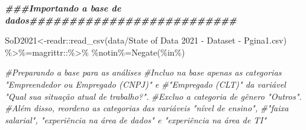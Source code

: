 \documentclass[
]{article}
\newenvironment{Shaded}{\begin{snugshade}}{\end{snugshade}}
\newcommand{\AttributeTok}[1]{\textcolor[rgb]{0.77,0.63,0.00}{#1}}
\newcommand{\CommentTok}[1]{\textcolor[rgb]{0.56,0.35,0.01}{\textit{#1}}}
\newcommand{\DocumentationTok}[1]{\textcolor[rgb]{0.56,0.35,0.01}{\textbf{\textit{#1}}}}
\newcommand{\FunctionTok}[1]{\textcolor[rgb]{0.00,0.00,0.00}{#1}}
\newcommand{\NormalTok}[1]{#1}
\newcommand{\OtherTok}[1]{\textcolor[rgb]{0.56,0.35,0.01}{#1}}
\newcommand{\SpecialCharTok}[1]{\textcolor[rgb]{0.00,0.00,0.00}{#1}}
\newcommand{\StringTok}[1]{\textcolor[rgb]{0.31,0.60,0.02}{#1}}
\begin{document}
\begin{Shaded}
\begin{Highlighting}[]
\DocumentationTok{\#\#\#Importando a base de dados\#\#\#\#\#\#\#\#\#\#\#\#\#\#\#\#\#\#\#\#\#\#\#\#\#\#}

\NormalTok{SoD2021}\OtherTok{\textless{}{-}}\NormalTok{readr}\SpecialCharTok{::}\FunctionTok{read\_csv}\NormalTok{(}\StringTok{\textquotesingle{}data/State of Data 2021 {-} Dataset {-} Pgina1.csv\textquotesingle{}}\NormalTok{)}
\StringTok{\textasciigrave{}}\AttributeTok{\%\textgreater{}\%}\StringTok{\textasciigrave{}}\OtherTok{=}\NormalTok{magrittr}\SpecialCharTok{::}\StringTok{\textasciigrave{}}\AttributeTok{\%\textgreater{}\%}\StringTok{\textasciigrave{}}
\StringTok{\textasciigrave{}}\AttributeTok{\%notin\%}\StringTok{\textasciigrave{}}\OtherTok{=}\FunctionTok{Negate}\NormalTok{(}\StringTok{\textasciigrave{}}\AttributeTok{\%in\%}\StringTok{\textasciigrave{}}\NormalTok{)}

\CommentTok{\#Preparando a base para as análises}
\CommentTok{\#Incluo na base apenas as categorias "Empreendedor ou Empregado (CNPJ)" e}
\CommentTok{\#"Empregado (CLT)" da variável "Qual sua situação atual de trabalho?".}
\CommentTok{\#Excluo a categoria de gênero "Outros".}
\CommentTok{\#Além disso, reordeno as categorias das variáveis "nível de ensino",}
\CommentTok{\#"faixa salarial", "experiência na área de dados" e "experiência na área de TI"}


\end{Highlighting}
\end{Shaded}
\end{document}
